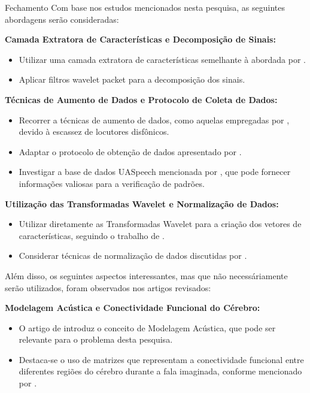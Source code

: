 \documentclass[aspectratio=169]{beamer}
\begin{document}
	\begin{frame}[allowframebreaks]{Fechamento}
		Com base nos estudos mencionados nesta pesquisa, as seguintes abordagens serão consideradas:
		
		\par \textbf{Camada Extratora de Características e Decomposição de Sinais:}
		\begin{itemize}
			\item Utilizar uma camada extratora de características semelhante à abordada por \cite{WOS:000841879504172}.
			\item Aplicar filtros wavelet packet para a decomposição dos sinais.
		\end{itemize}
		
		\par \textbf{Técnicas de Aumento de Dados e Protocolo de Coleta de Dados:}
		\begin{itemize}
			\item Recorrer a técnicas de aumento de dados, como aquelas empregadas por \cite{jin21_interspeech}, devido à escassez de locutores disfônicos.
			\item Adaptar o protocolo de obtenção de dados apresentado por \cite{tamm2020classification}.
			\item Investigar a base de dados UASpeech mencionada por \cite{tamm2020classification}, que pode fornecer informações valiosas para a verificação de padrões.
		\end{itemize}
		
		\framebreak
		
		\par \textbf{Utilização das Transformadas Wavelet e Normalização de Dados:}
		\begin{itemize}
			\item Utilizar diretamente as Transformadas Wavelet para a criação dos vetores de características, seguindo o trabalho de \cite{WOS:000591530700001}.
			\item Considerar técnicas de normalização de dados discutidas por \cite{WOS:000857544900001}.
		\end{itemize}
		
		\framebreak
		
		\par Além disso, os seguintes aspectos interessantes, mas que não necessáriamente serão utilizados, foram observados nos artigos revisados:
		
		\par \textbf{Modelagem Acústica e Conectividade Funcional do Cérebro:}
		\begin{itemize}
			\item O artigo de \cite{6296526} introduz o conceito de Modelagem Acústica, que pode ser relevante para o problema desta pesquisa.
			\item Destaca-se o uso de matrizes que representam a conectividade funcional entre diferentes regiões do cérebro durante a fala imaginada, conforme mencionado por \cite{bakhshali2022investigating}.
		\end{itemize}
		

\end{frame}
\end{document}
